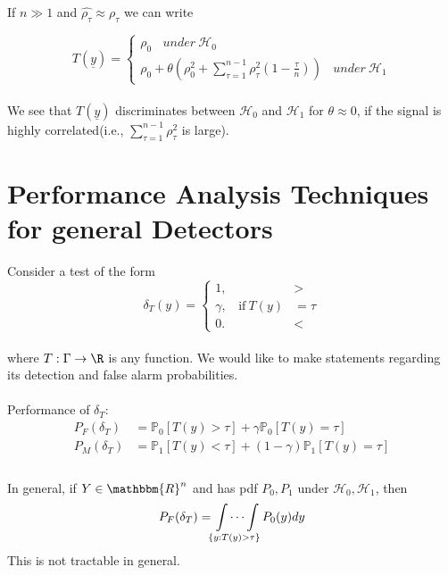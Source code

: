 \documentclass[12pt]{report}
\begin{document}
\noindent If $n \gg 1$ and $\hat{\rho_{\tau}} \approx \rho_{\tau}$ we can write

\begin{equation}
\label{l10}
T(\underline{y}) =  
\begin{cases}
\rho_0 \ \ \ \ under \ \mathcal{H}_0 \\
\rho_0 + \theta \left(\rho^2_0 + \sum\limits_{\tau = 1}^{n-1}\rho^2_{\tau}\left(1-\frac{\tau}{n}\right)\right) \ \ \ \ under \ \mathcal{H}_1
\end{cases}
\end{equation}\\
We see that $T({\underline{y}})$ discriminates between $\mathcal{H}_0$ and $\mathcal{H}_1$ for $\theta \approx 0$, if the signal is highly correlated(i.e., $\sum\limits_{\tau=1}^{n-1}\rho^2_{\tau}$ is large). 

 

	
\section{Performance Analysis Techniques for general Detectors}

Consider a test of the form
\begin{equation}
\delta_T(y) =  
\begin{cases}
1, &>  \\
\gamma,  \ \ \ \  \mbox{if}~T(y)&= \tau  \\
0. &<
\end{cases}
\end{equation}\\
where {$T: \Gamma \to \R$} is any function. We would like to make statements regarding its detection and false alarm probabilities.\\
\\
Performance of {$\delta_T:$}\\
\begin{equation}
\begin{aligned}
P_F(\delta_T) &= \mathbb{P}_0[T(y)>\tau] + \gamma\mathbb{P}_0[T(y)=\tau]\\
P_M(\delta_T) &= \mathbb{P}_1[T(y)<\tau] + (1-\gamma)\mathbb{P}_1[T(y)=\tau]\\
\end{aligned}	
\end{equation}
\\
In general, if $Y\in \mathbbm{R}^{n}$ and has pdf {$P_0, P_1$} under $\mathcal{H}_0,\mathcal{H}_1$, then\\
\begin{equation}
\label{l11}	
\begin{aligned}
P_F(\delta_T)=\idotsint\limits_{\{y:T(y)>\tau\}}P_0(y)dy
\end{aligned}
\end{equation}
This is not tractable in general.
\end{document}
